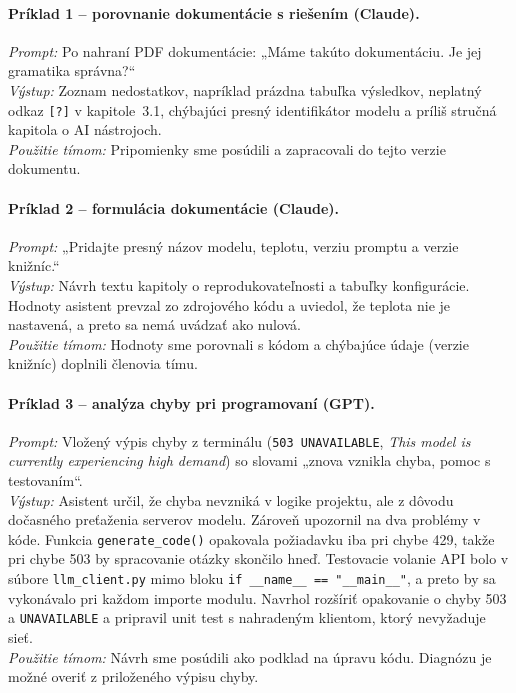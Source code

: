 \paragraph{Príklad 1 -- porovnanie dokumentácie s riešením (Claude).}
\emph{Prompt:} Po nahraní PDF dokumentácie: „Máme takúto dokumentáciu. Je jej gramatika správna?“\\
\emph{Výstup:} Zoznam nedostatkov, napríklad prázdna tabuľka výsledkov, neplatný odkaz \texttt{[?]} v kapitole~3.1, chýbajúci presný identifikátor modelu a príliš stručná kapitola o AI nástrojoch.\\
\emph{Použitie tímom:} Pripomienky sme posúdili a zapracovali do tejto verzie dokumentu.

\paragraph{Príklad 2 -- formulácia dokumentácie (Claude).}
\emph{Prompt:} „Pridajte presný názov modelu, teplotu, verziu promptu a verzie knižníc.“\\
\emph{Výstup:} Návrh textu kapitoly o reprodukovateľnosti a tabuľky konfigurácie. Hodnoty asistent prevzal zo zdrojového kódu a uviedol, že teplota nie je nastavená, a preto sa nemá uvádzať ako nulová.\\
\emph{Použitie tímom:} Hodnoty sme porovnali s kódom a chýbajúce údaje (verzie knižníc) doplnili členovia tímu.

\paragraph{Príklad 3 -- analýza chyby pri programovaní (GPT).}
\emph{Prompt:} Vložený výpis chyby z terminálu (\texttt{503 UNAVAILABLE}, \emph{This model is currently experiencing high demand}) so slovami „znova vznikla chyba, pomoc s testovaním“.\\
\emph{Výstup:} Asistent určil, že chyba nevzniká v logike projektu, ale z dôvodu dočasného preťaženia serverov modelu. Zároveň upozornil na dva problémy v kóde. Funkcia \texttt{generate\_code()} opakovala požiadavku iba pri chybe 429, takže pri chybe 503 by spracovanie otázky skončilo hneď. Testovacie volanie API bolo v súbore \texttt{llm\_client.py} mimo bloku \texttt{if \_\_name\_\_ == "\_\_main\_\_"}, a preto by sa vykonávalo pri každom importe modulu. Navrhol rozšíriť opakovanie o chyby 503 a \texttt{UNAVAILABLE} a pripravil unit test s nahradeným klientom, ktorý nevyžaduje sieť.\\
\emph{Použitie tímom:} Návrh sme posúdili ako podklad na úpravu kódu. Diagnózu je možné overiť z priloženého výpisu chyby.


